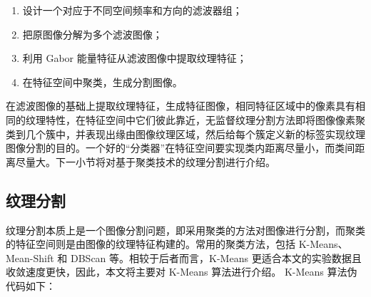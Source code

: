 \begin{enumerate}
	\item 设计一个对应于不同空间频率和方向的滤波器组；
	\item 把原图像分解为多个滤波图像；
	\item 利用 Gabor 能量特征从滤波图像中提取纹理特征；
	\item 在特征空间中聚类，生成分割图像。
\end{enumerate}

在滤波图像的基础上提取纹理特征，生成特征图像，相同特征区域中的像素具有相同的纹理特性，在特征空间中它们彼此靠近，无监督纹理分割方法即将图像像素聚类到几个簇中，并表现出缘由图像纹理区域，然后给每个簇定义新的标签实现纹理图像分割的目的。一个好的“分类器”在特征空间要实现类内距离尽量小，而类间距离尽量大。下一小节将对基于聚类技术的纹理分割进行介绍。

\subsection{纹理分割}

纹理分割本质上是一个图像分割问题，即采用聚类的方法对图像进行分割，而聚类的特征空间则是由图像的纹理特征构建的。常用的聚类方法，包括 K-Means、Mean-Shift 和 DBScan 等。相较于后者而言，K-Means 更适合本文的实验数据且收敛速度更快，因此，本文将主要对 K-Means 算法进行介绍。 K-Means 算法伪代码如下：
 
